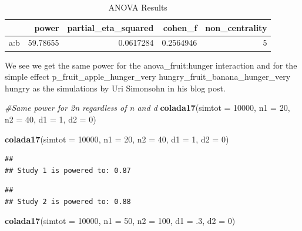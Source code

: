 \documentclass[]{book}
\newenvironment{Shaded}{\begin{snugshade}}{\end{snugshade}}
\newcommand{\CommentTok}[1]{\textcolor[rgb]{0.56,0.35,0.01}{\textit{#1}}}
\newcommand{\DataTypeTok}[1]{\textcolor[rgb]{0.13,0.29,0.53}{#1}}
\newcommand{\DecValTok}[1]{\textcolor[rgb]{0.00,0.00,0.81}{#1}}
\newcommand{\FloatTok}[1]{\textcolor[rgb]{0.00,0.00,0.81}{#1}}
\newcommand{\KeywordTok}[1]{\textcolor[rgb]{0.13,0.29,0.53}{\textbf{#1}}}
\newcommand{\NormalTok}[1]{#1}
\begin{document}
\begin{table}[!h]

\caption{\label{tab:unnamed-chunk-257}ANOVA Results}
\centering
\begin{tabular}{l|r|r|r|r}
\hline
  & power & partial\_eta\_squared & cohen\_f & non\_centrality\\
\hline
a:b & 59.78655 & 0.0617284 & 0.2564946 & 5\\
\hline
\end{tabular}
\end{table}

We see we get the same power for the anova\_fruit:hunger interaction and for the simple effect p\_fruit\_apple\_hunger\_very hungry\_fruit\_banana\_hunger\_very hungry as the simulations by Uri Simonsohn in his blog post.

\begin{Shaded}
\begin{Highlighting}[]
\CommentTok{#Same power for 2n regardless of n and d}
\KeywordTok{colada17}\NormalTok{(}\DataTypeTok{simtot =} \DecValTok{10000}\NormalTok{, }\DataTypeTok{n1 =} \DecValTok{20}\NormalTok{, }\DataTypeTok{n2 =} \DecValTok{40}\NormalTok{, }\DataTypeTok{d1 =} \DecValTok{1}\NormalTok{, }\DataTypeTok{d2 =} \DecValTok{0}\NormalTok{)  }

\KeywordTok{colada17}\NormalTok{(}\DataTypeTok{simtot =} \DecValTok{10000}\NormalTok{, }\DataTypeTok{n1 =} \DecValTok{20}\NormalTok{, }\DataTypeTok{n2 =} \DecValTok{40}\NormalTok{, }\DataTypeTok{d1 =} \DecValTok{1}\NormalTok{, }\DataTypeTok{d2 =} \DecValTok{0}\NormalTok{) }
\end{Highlighting}
\end{Shaded}

\begin{verbatim}
## 
## Study 1 is powered to: 0.87
\end{verbatim}

\begin{verbatim}
## 
## Study 2 is powered to: 0.88
\end{verbatim}

\begin{Shaded}
\begin{Highlighting}[]
\KeywordTok{colada17}\NormalTok{(}\DataTypeTok{simtot =} \DecValTok{10000}\NormalTok{, }\DataTypeTok{n1 =} \DecValTok{50}\NormalTok{, }\DataTypeTok{n2 =} \DecValTok{100}\NormalTok{, }\DataTypeTok{d1 =} \FloatTok{.3}\NormalTok{, }\DataTypeTok{d2 =} \DecValTok{0}\NormalTok{)}
\end{Highlighting}
\end{Shaded}
\end{document}
